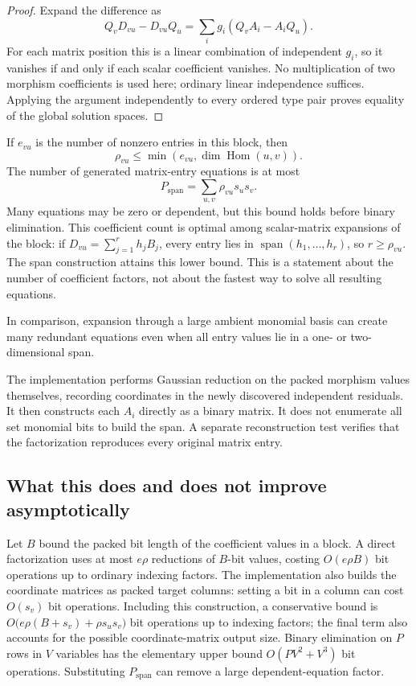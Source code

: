 \documentclass[11pt]{article}
\theoremstyle{definition}
\newcommand{\Span}{\operatorname{span}}
\begin{document}
\begin{proof}
Expand the difference as
\[
 Q_vD_{vu}-D_{vu}Q_u
             =\sum_i g_i(Q_vA_i-A_iQ_u).
\]
For each matrix position this is a linear combination of independent
$g_i$, so it vanishes if and only if each scalar coefficient vanishes.
No multiplication of two morphism coefficients is used here; ordinary
linear independence suffices. Applying the argument independently to
every ordered type pair proves equality of the global solution spaces.
\end{proof}

If $e_{vu}$ is the number of nonzero entries in this block, then
\[
       \rho_{vu}\le\min(e_{vu},\dim\operatorname{Hom}(u,v)).
\]
The number of generated matrix-entry equations is at most
\[
                  P_{\mathrm{span}}=
                     \sum_{u,v}\rho_{vu}s_us_v.
\]
Many equations may be zero or dependent, but this bound holds before
binary elimination. This coefficient count is optimal among scalar-matrix
expansions of the block: if $D_{vu}=\sum_{j=1}^{r}h_jB_j$, every entry
lies in $\Span(h_1,\ldots,h_r)$, so $r\ge\rho_{vu}$. The span
construction attains this lower bound. This is a statement about the
number of coefficient factors, not about the fastest way to solve all
resulting equations.

In comparison, expansion through a large ambient
monomial basis can create many redundant equations even when all
entry values lie in a one- or two-dimensional span.

The implementation performs Gaussian reduction on the packed
morphism values themselves, recording coordinates in the newly
discovered independent residuals. It then constructs each $A_i$
directly as a binary matrix. It does not enumerate all set monomial
bits to build the span. A separate reconstruction test verifies that
the factorization reproduces every original matrix entry.

\subsection{What this does and does not improve asymptotically}

Let $B$ bound the packed bit length of the coefficient values in a
block. A direct factorization uses at most $e\rho$ reductions of
$B$-bit values, costing $O(e\rho B)$ bit operations up to ordinary
indexing factors. The implementation also builds the coordinate
matrices as packed target columns: setting a bit in a column can
cost $O(s_v)$ bit operations. Including this construction, a
conservative bound is
$O\bigl(e\rho(B+s_v)+\rho s_us_v\bigr)$ bit operations up to
indexing factors; the final term also accounts for the possible
coordinate-matrix output size.
Binary elimination on $P$ rows in $V$ variables has the elementary
upper bound $O(PV^2+V^3)$ bit operations. Substituting
$P_{\mathrm{span}}$ can remove a large dependent-equation factor.
\end{document}

